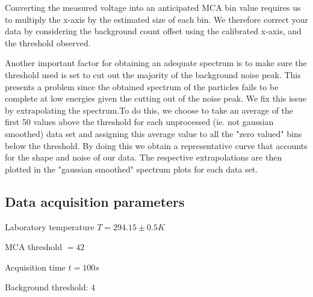 \documentclass[a4paper]{article}
\newenvironment{itemizeReduced}{
\begin{list}{\labelitemi}{\leftmargin=1em}
\setlength{\itemsep}{1pt}
\setlength{\parskip}{0pt}
\setlength{\parsep}{0pt}}{\end{list}
}
\begin{document}
\begin{multicols}{2}
Converting the measured voltage into an anticipated MCA bin value requires us to multiply the x-axis by the estimated size of each bin.
We therefore correct your data by considering the background count offset using the calibrated x-axis, and the threshold observed.

Another important factor for obtaining an adequate spectrum is to make sure the threshold used is set to cut out the majority of the background noise peak. This presents a problem since the obtained spectrum of the particles fails to be complete at low energies given the cutting out of the noise peak. We fix this issue by extrapolating the spectrum.To do this, we choose to take an average of the first 50 values above the threshold for each unprocessed (ie. not gaussian smoothed) data set and assigning this average value to all the "zero valued" bins below the threshold.
By doing this we obtain a representative curve that accounts for the shape and noise of our data. The respective extrapolations are then plotted in the "gaussian smoothed" spectrum plots for each data set.

\subsection{Data acquisition parameters}
\begin{itemizeReduced}
    \item Laboratory temperature $T = 294.15 \pm 0.5 K$
    \item MCA threshold $ = 42$
    \item Acquisition time $t = 100s$
    \item Background threshold: $4$
\end{itemizeReduced}
\end{multicols}

\clearpage
\end{document}
